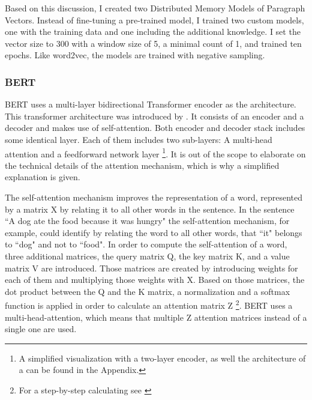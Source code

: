 \documentclass[12pt, a4paper, titlepage]{article}
\begin{document}
Based on this discussion, I created two Distributed Memory Models of Paragraph Vectors. Instead of fine-tuning a pre-trained model, I trained two custom models, one with the training data and one including the additional knowledge. I set the vector size to 300 with a window size of 5, a minimal count of 1, and trained ten epochs. Like word2vec, the models are trained with negative sampling. 

\subsubsection*{BERT}
\ac{BERT} uses a multi-layer bidirectional Transformer encoder as the architecture. This transformer architecture was introduced by \citet{vaswani2017}. It consists of an encoder and a decoder and makes use of self-attention. Both encoder and decoder stack includes some identical layer. Each of them includes two sub-layers: A multi-head attention and a feedforward network layer \footnote{A simplified visualization with a two-layer encoder, as well the architecture of a  can be found in the Appendix.}. It is out of the scope to elaborate on the technical details of the attention mechanism, which is why a simplified explanation is given. 

The self-attention mechanism improves the representation of a word, represented by a matrix X by relating it to all other words in the sentence. In the sentence ``A dog ate the food because it was hungry" \citep[10]{ravichandiran2021} the self-attention mechanism, for example, could identify by relating the word to all other words, that ``it" belongs to ``dog" and not to ``food". 
In order to compute the self-attention of a word, three additional matrices, the query matrix Q, the key matrix K, and a value matrix V are introduced. Those matrices are created by introducing weights for each of them and multiplying those weights with X. Based on those matrices, the dot product between the Q and the K matrix, a normalization and a softmax function is applied in order to calculate an attention matrix Z  \footnote{For a step-by-step calculating see \citep{ravichandiran2021}}. \ac{BERT} uses a multi-head-attention, which means that multiple Z attention matrices instead of a single one are used.
\end{document}
